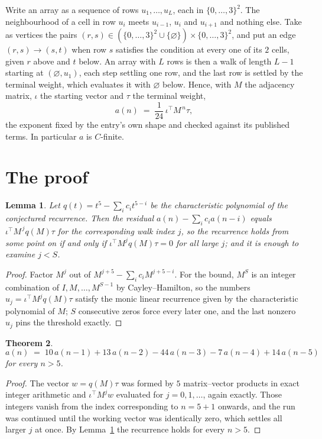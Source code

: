 \documentclass[11pt,a4paper]{article}
\theoremstyle{plain}
\newtheorem{theorem}{Theorem}
\newtheorem{lemma}[theorem]{Lemma}
\theoremstyle{definition}
\begin{document}
Write an array as a sequence of rows $u_1,\dots,u_L$, each in
$\{0,\dots,3\}^{2}$. The neighbourhood of a cell in row $u_i$ meets $u_{i-1}$,
$u_i$ and $u_{i+1}$ and nothing else. Take as vertices the pairs
$(r,s)\in(\{0,\dots,3\}^{2}\cup\{\varnothing\})\times\{0,\dots,3\}^{2}$,
and put an edge $(r,s)\to(s,t)$ when row $s$ satisfies the condition at every one of its
$2$ cells, given $r$ above and $t$ below. An array with $L$ rows is then a walk of length
$L-1$ starting at $(\varnothing,u_1)$, each step settling one row, and the last row is
settled by the terminal weight, which evaluates it with $\varnothing$ below. Hence,
with $M$ the adjacency matrix, $\iota$ the starting vector and $\tau$ the terminal weight,
\[
a(n)\;=\;\frac{1}{24}\,\iota^{\!\top}M^{\,n}\tau ,
\]
the exponent fixed by the entry's own shape and checked against its published terms. In
particular $a$ is $C$-finite.

\section{The proof}

\begin{lemma}\label{lem:crit}
Let $q(t)=t^{5}-\sum_i c_it^{5-i}$ be the characteristic polynomial of the
conjectured recurrence. Then the residual $a(n)-\sum_ic_ia(n-i)$ equals
$\iota^{\!\top}M^{\,j}q(M)\tau$ for the corresponding walk index $j$, so the
recurrence holds from some point on if and only if $\iota^{\!\top}M^{j}q(M)\tau=0$ for all
large $j$; and it is enough to examine $j<S$.
\end{lemma}

\begin{proof}
Factor $M^{j}$ out of $M^{j+5}-\sum_ic_iM^{j+5-i}$. For the bound, $M^{S}$
is an integer combination of $I,M,\dots,M^{S-1}$ by Cayley--Hamilton, so the numbers
$u_j=\iota^{\!\top}M^{j}q(M)\tau$ satisfy the monic linear recurrence given by the
characteristic polynomial of $M$; $S$ consecutive zeros force every later one, and the last
nonzero $u_j$ pins the threshold exactly.
\end{proof}

\begin{theorem}
\[
a(n)\;=\;10\,a(n-1) + 13\,a(n-2) - 44\,a(n-3) - 7\,a(n-4) + 14\,a(n-5)
\]
for every $n>5$.
\end{theorem}

\begin{proof}
The vector $w=q(M)\tau$ was formed by $5$ matrix--vector products in exact integer
arithmetic and $\iota^{\!\top}M^{j}w$ evaluated for $j=0,1,\dots$, again exactly. Those
integers vanish from the index corresponding to $n=5+1$ onwards, and the run was
continued until the working vector was identically zero, which settles all larger $j$ at once.
By Lemma~\ref{lem:crit} the recurrence holds for every $n>5$.
\end{proof}
\end{document}
